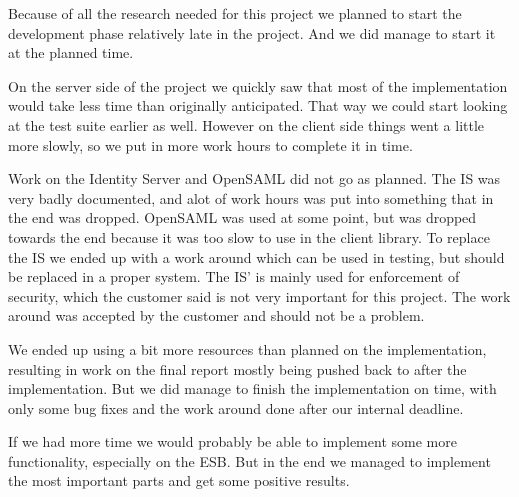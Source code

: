 
Because of all the research needed for this project we planned to start the development phase relatively late in the project. And we did manage to start it at the planned time.

On the server side of the project we quickly saw that most of the implementation would take less time than originally anticipated. That way we could start looking at the test suite earlier as well. However on the client side things went a little more slowly, so we put in more work hours to complete it in time. 

Work on the Identity Server and OpenSAML did not go as planned. The IS was very badly documented, and alot of work hours was put into something that in the end was dropped. OpenSAML was used at some point, but was dropped towards the end because it was too slow to use in the client library. To replace the IS we ended up with a work around which can be used in testing, but should be replaced in a proper system. The IS' is mainly used for enforcement of security, which the customer said is not very important for this project. The work around was accepted by the customer and should not be a problem.

We ended up using a bit more resources than planned on the implementation, resulting in work on the final report mostly being pushed back to after the implementation. But we did manage to finish the implementation on time, with only some bug fixes and the work around done after our internal deadline.

If we had more time we would probably be able to implement some more functionality, especially on the ESB. But in the end we managed to implement the most important parts and get some positive results.